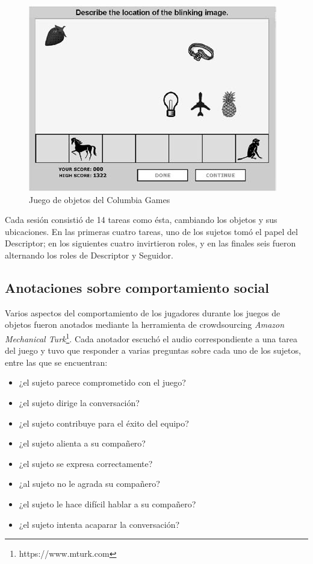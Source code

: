 \begin{figure}
\centering
\includegraphics[scale=0.5]{images/columbia_games.jpg}
\caption{Juego de objetos del Columbia Games}
\label{objects_game}
\end{figure}


Cada sesión consistió de 14 tareas como ésta, cambiando los objetos y sus ubicaciones. En las primeras cuatro tareas, uno de los sujetos tomó el papel del Descriptor; en los siguientes cuatro invirtieron roles, y en las finales seis fueron alternando los roles de Descriptor y Seguidor.

\subsection{Anotaciones sobre comportamiento social}

Varios aspectos del comportamiento de los jugadores durante los juegos de objetos fueron anotados mediante la herramienta de crowdsourcing \emph{Amazon Mechanical Turk}\footnote{https://www.mturk.com}. Cada anotador escuchó el audio correspondiente a una tarea del juego y tuvo que responder a varias preguntas sobre cada uno de los sujetos, entre las que se encuentran:

\begin{itemize}
  \item ¿el sujeto parece comprometido con el juego?
  \item ¿el sujeto dirige la conversación?
  \item ¿el sujeto contribuye para el éxito del equipo?
  \item ¿el sujeto alienta a su compañero?
  \item ¿el sujeto se expresa correctamente?
  \item ¿al sujeto no le agrada su compañero?
  \item ¿el sujeto le hace difícil hablar a su compañero?
  \item ¿el sujeto intenta acaparar la conversación?
\end{itemize}

